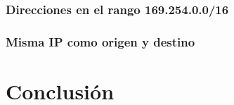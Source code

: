 \documentclass[a4paper, 10pt, twoside]{article}
\begin{document}
\subsubsection{Direcciones en el rango 169.254.0.0/16}


\subsubsection{Misma IP como origen y destino}





\section{Conclusión}
\end{document}
